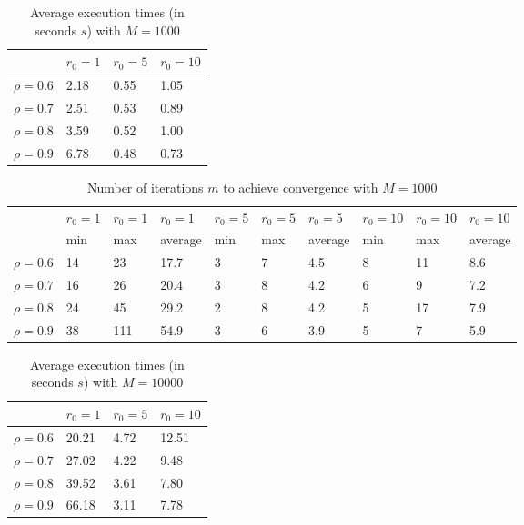\documentclass[a4paper,11pt,openright]{report}
\begin{document}
\begin{table}[H]
\centering
\addtolength{\leftskip}{-1.5cm}
\addtolength{\rightskip}{-1.5cm}
\begin{tabular}{|c|lll|}
\hline
$ $ & $r_0 = 1$ & $r_0 = 5$ & $r_0 = 10$ \\
\hline
$\rho = 0.6$ & 2.18 & 0.55 & 1.05 \\

$\rho = 0.7$ & 2.51 & 0.53 & 0.89 \\

$\rho = 0.8$ & 3.59 & 0.52 & 1.00 \\

$\rho = 0.9$ & 6.78 & 0.48 & 0.73 \\
\hline
\end{tabular}
\caption{Average execution
 times (in seconds $s$) with $M = 1000$}
\end{table}
\begin{table}[H]
\centering
\addtolength{\leftskip}{-1.5cm}
\addtolength{\rightskip}{-1.5cm}
\begin{tabular}{|c|lllllllll|}
\hline
$ $ & $r_0 = 1$ & $r_0 = 1$ & $r_0 = 1$ & $r_0 = 5$ & $r_0 = 5$ & $r_0 = 5$ & $r_0 = 10$ & $r_0 = 10$ & $r_0 = 10$  \\
$ $ & min & max & average & min & max & average & min & max & average \\ 
\hline
$\rho = 0.6$ & 14 & 23 & 17.7 & 3 & 7 & 4.5 & 8 & 11 & 8.6 \\

$\rho = 0.7$ & 16 & 26 & 20.4 & 3 & 8 & 4.2 & 6 & 9 & 7.2 \\

$\rho = 0.8$ & 24 & 45 & 29.2 & 2 & 8 & 4.2 & 5 & 17 & 7.9 \\

$\rho = 0.9$ & 38 & 111 & 54.9 & 3 & 6 & 3.9 & 5 & 7 & 5.9\\
\hline
\end{tabular}
\caption{Number of iterations $m$ to achieve convergence with $M = 1000$}
\end{table}
\begin{table}[H]
\centering
\addtolength{\leftskip}{-1.5cm}
\addtolength{\rightskip}{-1.5cm}
\begin{tabular}{|c|lll|}
\hline
$ $ & $r_0 = 1$ & $r_0 = 5$ & $r_0 = 10$ \\
\hline
$\rho = 0.6$ & 20.21 & 4.72 & 12.51 \\

$\rho = 0.7$ & 27.02 & 4.22 & 9.48 \\

$\rho = 0.8$ & 39.52 & 3.61 & 7.80 \\

$\rho = 0.9$ & 66.18 & 3.11 & 7.78 \\
\hline
\end{tabular}
\caption{Average execution
 times (in seconds $s$) with $M = 10000$}
\end{table}
\end{document}
